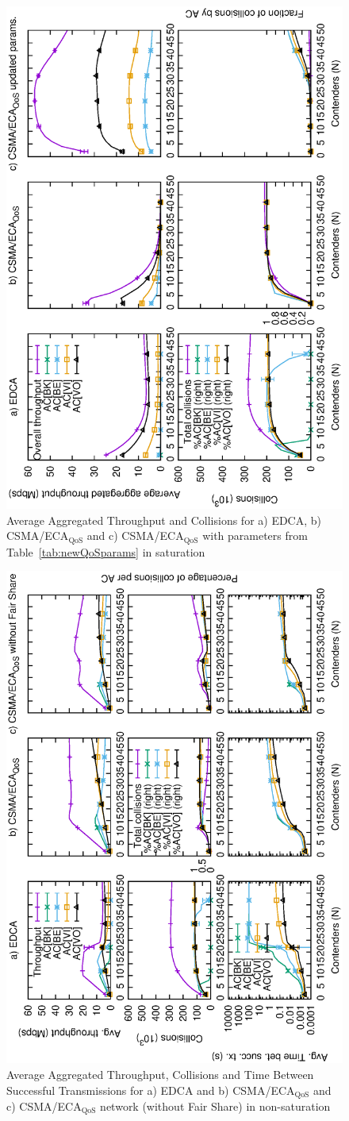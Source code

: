 \begin{figure}[tb]
	\centering
		\includegraphics[width=0.55\linewidth,angle = -90]{figures/multiplot-sat-perfect.eps}
		\caption{Average Aggregated Throughput and Collisions for a) EDCA, b) CSMA/ECA$_{\text{QoS}}$ and c) CSMA/ECA$_{\text{QoS}}$ with parameters from Table~\ref{tab:newQoSparams} in saturation}
		\label{fig:multiplotSat}
\end{figure}

\begin{figure}[tb]
	\centering
		\includegraphics[width=0.55\linewidth,angle = -90]{figures/multiplot-unsat-error-0-1.eps}
		\caption{Average Aggregated Throughput, Collisions and Time Between Successful Transmissions for a) EDCA and b) CSMA/ECA$_{\text{QoS}}$ and c) CSMA/ECA$_{\text{QoS}}$ network (without Fair Share) in non-saturation}
		\label{fig:multiplotUnsat}
\end{figure}
	
